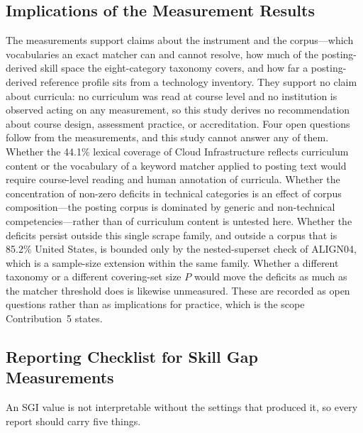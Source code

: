 \documentclass[journal]{IEEEtran}
\begin{document}
\subsection{Implications of the Measurement Results}

The measurements support claims about the instrument and the corpus---which vocabularies an exact matcher can and cannot resolve, how much of the posting-derived skill space the eight-category taxonomy covers, and how far a posting-derived reference profile sits from a technology inventory. They support no claim about curricula: no curriculum was read at course level and no institution is observed acting on any measurement, so this study derives no recommendation about course design, assessment practice, or accreditation. Four open questions follow from the measurements, and this study cannot answer any of them. Whether the 44.1\% lexical coverage of Cloud Infrastructure reflects curriculum content or the vocabulary of a keyword matcher applied to posting text would require course-level reading and human annotation of curricula. Whether the concentration of non-zero deficits in technical categories is an effect of corpus composition---the posting corpus is dominated by generic and non-technical competencies---rather than of curriculum content is untested here. Whether the deficits persist outside this single scrape family, and outside a corpus that is 85.2\% United States, is bounded only by the nested-superset check of ALIGN04, which is a sample-size extension within the same family. Whether a different taxonomy or a different covering-set size $P$ would move the deficits as much as the matcher threshold does is likewise unmeasured. These are recorded as open questions rather than as implications for practice, which is the scope Contribution~5 states.

\subsection{Reporting Checklist for Skill Gap Measurements}

\label{sec:reporting}

An SGI value is not interpretable without the settings that produced it, so every report should carry five things.
\end{document}
